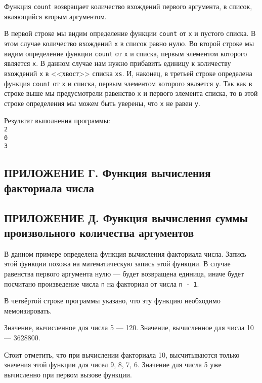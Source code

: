     Функция \verb,count, возвращает количество вхождений первого аргумента, в список, являющийся вторым аргументом.
    
    В первой строке мы видим определение функции \verb,count, от \verb,x, и пустого списка.
    В этом случае количество вхождений \verb,x, в список равно нулю.
    Во второй строке мы видим определение функции \verb,count, от \verb,x, и списка, первым элементом которого является \verb,x,.
    В данном случае нам нужно прибавить единицу к количеству вхождений \verb,x, в <<хвост>> списка \verb,xs,.
    И, наконец, в третьей строке определена функция \verb,count, от \verb,x, и списка, первым элементом которого является \verb,y,.
    Так как в строке выше мы предусмотрели равенство \verb,x, и первого элемента списка, то в этой строке определения мы можем быть уверены, что \verb,x, не равен \verb,y,.

    Результат выполнения программы:
    \\\verb,2,
    \\\verb,0,
    \\\verb,3,
    \subsection*{ПРИЛОЖЕНИЕ Г. Функция вычисления факториала числа}
    

    \subsection*{ПРИЛОЖЕНИЕ Д. Функция вычисления суммы произвольного количества аргументов}
    

    В данном примере определена функция вычисления факториала числа.
    Запись этой функции похожа на математическую запись этой функции.
    В случае равенства первого аргумента нулю --- будет возвращена единица,
    иначе будет посчитано произведение числа \verb,n, на факториал от числа \verb,n - 1,.

    В четвёртой строке программы указано, что эту функцию необходимо мемоизировать.

    Значение, вычисленное для числа 5 --- 120.
    Значение, вычисленное для числа 10 --- 3628800.

    Стоит отметить, что при вычислении факториала 10, высчитываются только значения этой функции для чисел 9, 8, 7, 6.
    Значение для числа 5 уже вычисленно при первом вызове функции.

